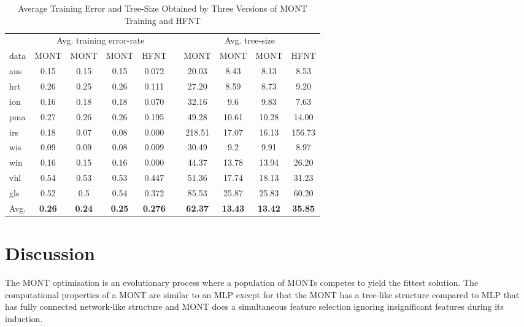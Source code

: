 \documentclass[conference]{IEEEtran}
\begin{document}
\begin{table*}
\begin{table}
    \begin{center}
        \renewcommand{\arraystretch}{1.1}
        \setlength{\tabcolsep}{1pt}
        {\caption{Average Training Error and Tree-Size Obtained by Three Versions of MONT Training and HFNT}
            \label{tab:tree_error_size}}
        \begin{tabular}{lccccccccc}
            \hline
            &  \multicolumn{4}{c}{Avg. training error-rate} & & \multicolumn{4}{c}{Avg. tree-size}\\
            \cline{2-5}  \cline{7-10} 
            data & MONT & MONT & MONT & HFNT & & MONT & MONT & MONT  & HFNT \\
            \hline
            aus & 0.15 & 0.15 & 0.15 & 0.072 & &  20.03 & 8.43 & 8.13 & 8.53 \\
            hrt & 0.26 & 0.25 & 0.26 & 0.111 & & 27.20 & 8.59 & 8.73 & 9.20 \\
            ion & 0.16 & 0.18 & 0.18 & 0.070 & & 32.16 & 9.6 & 9.83 & 7.63 \\
            pma & 0.27 & 0.26 & 0.26 & 0.195 & & 49.28 & 10.61 & 10.28 & 14.00 \\
            irs & 0.18 & 0.07 & 0.08 & 0.000 & & 218.51 & 17.07 & 16.13 & 156.73 \\
            wis & 0.09 & 0.09 & 0.08 & 0.009 & & 30.49 & 9.2 & 9.91 & 8.97 \\
            win & 0.16 & 0.15 & 0.16 & 0.000 & & 44.37 & 13.78 & 13.94 & 26.20 \\
            vhl & 0.54 & 0.53 & 0.53 & 0.447 & & 51.36 & 17.74 & 18.13 & 31.23 \\
            gls & 0.52 & 0.5 & 0.54 & 0.372 & & 85.53 & 25.87 & 25.83 & 60.20 \\
            \hline
            Avg. & \textbf{0.26} & \textbf{0.24} & \textbf{0.25} & \textbf{0.276} & & \textbf{62.37} & \textbf{13.43} & \textbf{13.42} & \textbf{35.85} \\
            \hline
        \end{tabular}
    \end{center}
\end{table}


\section{Discussion}
\label{sec:dis}
The MONT optimisation is an evolutionary process where a population of MONTs competes to yield the fittest solution. The computational properties of a MONT are similar to an MLP except for that the MONT has a tree-like structure compared to MLP that has fully connected network-like structure and MONT does a simultaneous feature selection ignoring insignificant features during its induction.



\end{table*}
\end{document}
